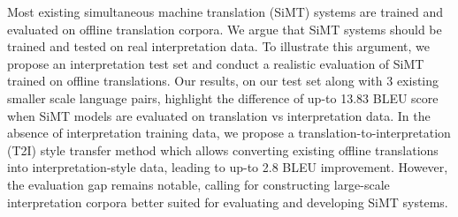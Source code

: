 Most existing simultaneous machine translation (SiMT) systems are trained and evaluated on offline translation corpora. We argue that SiMT systems should be trained and tested on real interpretation data. To illustrate this argument, we propose an interpretation test set and conduct a realistic evaluation of SiMT trained on offline translations. Our results, on our test set along with 3 existing smaller scale language pairs, highlight the difference of up-to 13.83 BLEU score when SiMT models are evaluated on translation vs interpretation data. In the absence of interpretation training data, we propose a translation-to-interpretation (T2I) style transfer method which allows converting existing offline translations into interpretation-style data, leading to up-to 2.8 BLEU improvement. However, the evaluation gap remains notable, calling for constructing large-scale interpretation corpora better suited for evaluating and developing SiMT systems.
